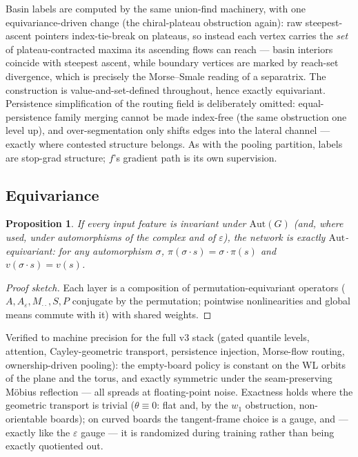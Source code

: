 \documentclass[11pt]{article}
\newtheorem{proposition}{Proposition}
\newcommand{\eps}{\varepsilon}
\newcommand{\Aut}{\mathrm{Aut}}
\begin{document}
Basin labels are computed by the same union-find machinery, with one
equivariance-driven change (the chiral-plateau obstruction again): raw
steepest-ascent pointers index-tie-break on plateaus, so instead each
vertex carries the \emph{set} of plateau-contracted maxima its ascending
flows can reach --- basin interiors coincide with steepest ascent, while
boundary vertices are marked by reach-set divergence, which is precisely
the Morse--Smale reading of a separatrix. The construction is
value-and-set-defined throughout, hence exactly equivariant.
Persistence simplification of the routing field is deliberately omitted:
equal-persistence family merging cannot be made index-free (the same
obstruction one level up), and over-segmentation only shifts edges into
the lateral channel --- exactly where contested structure belongs. As
with the pooling partition, labels are stop-grad structure; $f$'s
gradient path is its own supervision.

\subsection{Equivariance}
\label{sec:equivariance}
\begin{proposition}
If every input feature is invariant under $\Aut(G)$ (and, where used,
under automorphisms of the complex and of $\eps$), the network is exactly
$\Aut$-equivariant: for any automorphism $\sigma$,
$\pi(\sigma\cdot s)=\sigma\cdot\pi(s)$ and $v(\sigma\cdot s)=v(s)$.
\end{proposition}
\begin{proof}[Proof sketch]
Each layer is a composition of permutation-equivariant operators
($A,A_\eps,M_{\cdot\cdot},S,P$ conjugate by the permutation; pointwise
nonlinearities and global means commute with it) with shared weights.
\end{proof}
Verified to machine precision for the full v3 stack (gated quantile
levels, attention, Cayley-geometric transport, persistence injection,
Morse-flow routing, ownership-driven pooling): the empty-board
policy is constant on the WL orbits of the plane and the torus,
and exactly symmetric under the seam-preserving M\"obius reflection ---
all spreads at floating-point noise. Exactness holds where the geometric
transport is trivial ($\theta \equiv 0$: flat and, by the $w_1$
obstruction, non-orientable boards); on curved boards the tangent-frame
choice is a gauge, and --- exactly like the $\eps$ gauge --- it is
randomized during training rather than being exactly quotiented out.
\end{document}
